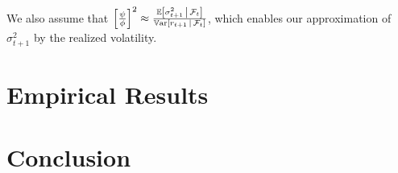 \documentclass[11pt, letterpaper, twoside, final]{article}
\begin{document}
We also assume that $\left[ \frac{\psi}{\phi} \right]^2 \approx \frac{\operatorname{\mathbb{E}} \left[\sigma^2_{t+1} \,\middle\vert\,
\mathcal{F}_t\right]}{\operatorname{\mathbb{V}ar}\left[r_{t+1} \,\middle\vert\, \mathcal{F}_t\right]}$, which enables our approximation of $\sigma^2_{t+1}$ by the
realized volatility.

\section{Empirical Results}

\section{Conclusion}

\clearpage

{}
\printbibliography
\clearpage
\end{document}
